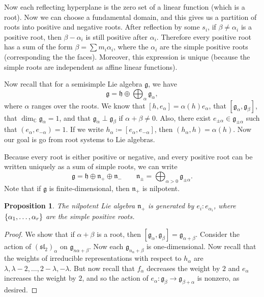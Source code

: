 \documentclass[leqno, openany]{memoir}
\newtheorem{prop}[thm]{Proposition}
\theoremstyle{definition}
\theoremstyle{remark}
\theoremstyle{plain}
\theoremstyle{definition}
\theoremstyle{remark}
\newcommand{\C}{\mathbb{C}}
\newcommand{\mf}[1]{\mathfrak{#1}}
\begin{document}
Now each reflecting hyperplane is the zero set of a linear function (which is a
root). Now we can choose a fundamental domain, and this gives us a partition of
roots into positive and negative roots. After reflection by some $s_i$, if
$\beta \neq \alpha_i$ is a positive root, then $\beta - \alpha_i$ is still
positive after $\alpha_i$. Therefore every positive root has a sum of the form
$\beta = \sum m_i \alpha_i$, where the $\alpha_i$ are the simple positive roots
(corresponding the the faces). Moreover, this expression is unique (because the
simple roots are independent as affine linear functions).

Now recall that for a semisimple Lie algebra $\mf{g}$, we have \[ \mf{g} =
\mf{h} \oplus \bigoplus_{\alpha} \mf{g}_{\alpha}, \] where $\alpha$ ranges over
the roots. We know that $[h,e_{\alpha}] = \alpha(h) e_{\alpha}$, that
$[\mf{g}_{\alpha}, \mf{g}_{\beta}]$, that $\dim_{\C} \mf{g}_{\alpha} = 1$, and
that $\mf{g}_{\alpha} \perp \mf{g}_{\beta}$ if $\alpha + \beta \neq 0$. Also,
there exist $e_{\pm \alpha} \in \mf{g}_{\pm \alpha}$ such that $(e_{\alpha},
e_{-\alpha}) = 1$. If we write $h_{\alpha} \coloneqq [e_{\alpha},
e_{-\alpha}]$, then $(h_{\alpha}, h) = \alpha(h)$. Now our goal is go from root
systems to Lie algebras.

Because every root is either positive or negative, and every positive root can
be written uniquely as a sum of simple roots, we can write \[ \mf{g} = \mf{h}
\oplus \mf{n}_+ \oplus \mf{n}_- \qquad \mf{n}_{\pm} = \bigoplus_{\alpha > 0}
\mf{g}_{\pm \alpha}. \] Note that if $\mf{g}$ is finite-dimensional, then
$\mf{n}_+$ is nilpotent.

\begin{prop} The nilpotent Lie algebra $\mf{n}_+$ is generated by $e_i \colon
e_{\alpha_i}$, where $\qty{\alpha_1, \ldots, \alpha_r}$ are the simple positive
roots.  \end{prop}

\begin{proof} We show that if $\alpha + \beta$ is a root, then
    $[\mf{g}_{\alpha}, \mf{g}_{\beta}] = \mf{g}_{\alpha + \beta}$. Consider the
    action of ${(\mf{sl}_2)}_{\alpha}$ on $\mf{g}_{n \alpha + \beta}$. Now each
    $\mf{g}_{n_{\alpha} + \beta}$ is one-dimensional. Now recall that the
    weights of irreducible representations with respect to $h_{\alpha}$ are
    $\lambda, \lambda - 2, \ldots, 2-\lambda, -\lambda$. But now recall that
    $f_{\alpha}$ decreases the weight by $2$ and $e_{\alpha}$ increases the
    weight by $2$, and so the action of $e_{\alpha} \colon \mf{g}_{\beta} \to
    \mf{g}_{\beta + \alpha}$ is nonzero, as desired.  \end{proof}
\end{document}
